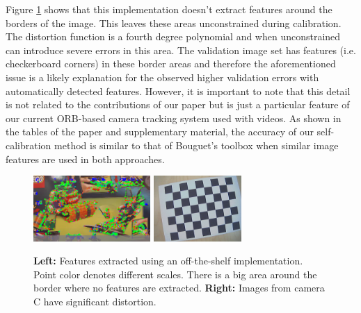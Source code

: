 \documentclass[10pt,twocolumn,letterpaper]{article}
\begin{document}
Figure \ref{fig:sample} shows that this implementation doesn't extract features around the borders of the image. This leaves these areas unconstrained during calibration. The distortion function is a fourth degree polynomial and when unconstrained can introduce severe errors in this area. The validation image set has features (i.e. checkerboard corners) in these border areas and therefore the aforementioned issue is a likely explanation for the observed higher validation errors with automatically detected features. However, it is important to note that this detail is not related to the contributions of our paper but is just a particular feature of our current ORB-based camera tracking system used with videos. As shown in the tables of the paper and supplementary material, the accuracy of our self-calibration method is similar to that of Bouguet’s toolbox when similar image features are used in both approaches.

\begin{figure}
\centering
\includegraphics[height=2.5cm]{features.png} 
\includegraphics[height=2.5cm]{sampleOldCam.jpg}
\caption{\textbf{Left:} Features extracted using an off-the-shelf implementation. Point color denotes different scales. There is a big area around the border where no features are extracted. \textbf{Right:} Images from camera C have significant distortion.}
\label{fig:sample}
\vspace*{-0.25cm}
\end{figure}
\end{document}
